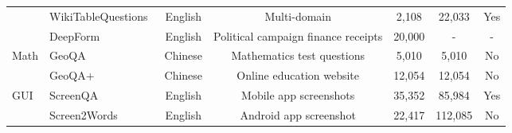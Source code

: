 \begin{tabular}{llccccc}
    &WikiTableQuestions~\cite{pasupat2015compositional}& English & Multi-domain & 2,108 & 22,033 & Yes\\
    &DeepForm~\cite{svetlichnaya2020deepform}& English & Political campaign finance receipts & 20,000 & - & - \\
    \midrule 
    \multirow{2}{*}{Math} & GeoQA~\cite{chen2021geoqa} & Chinese & Mathematics test questions & 5,010 & 5,010 & No\\
    & GeoQA+~\cite{cao2022augmented} & Chinese & Online education website & 12,054 & 12,054 & No\\
    \midrule 
    \multirow{2}{*}{GUI} & ScreenQA~\cite{hsiao2022screenqa} & English & Mobile app screenshots & 35,352 & 85,984 & Yes\\
    & Screen2Words~\cite{wang2021screen2words} & English & Android app screenshot & 22,417 & 112,085 & No\\
    \bottomrule
    \end{tabular}

